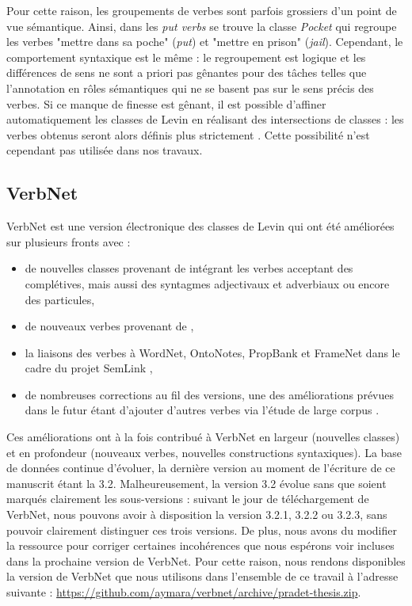 Pour cette raison, les groupements de verbes sont parfois grossiers d'un point
de vue sémantique. Ainsi, dans les \textit{put verbs} se trouve la classe
\textit{Pocket} qui regroupe les verbes "mettre dans sa poche" (\emph{put}) et
"mettre en prison" (\emph{jail}). Cependant, le comportement syntaxique est le
même : le regroupement est logique et les différences de sens ne sont a priori
pas gênantes pour des tâches telles que l'annotation en rôles sémantiques qui
ne se basent pas sur le sens précis des verbes. Si ce manque de finesse est
gênant, il est possible d'affiner automatiquement les classes de Levin en
réalisant des intersections de classes : les verbes obtenus seront alors
définis plus strictement \citep{dang1998investigating}. Cette possibilité n'est
cependant pas utilisée dans nos travaux.

\subsection{VerbNet}
\label{presentation_verbnet}

VerbNet \citep{kipperschuler2005verbnet} est une version électronique des
classes de Levin qui ont été améliorées sur plusieurs fronts avec :

\begin{itemize}

    \item de nouvelles classes provenant de \cite{korhonen2004extended}
        intégrant les verbes acceptant des complétives, mais aussi des
        syntagmes adjectivaux et adverbiaux ou encore des particules,

    \item de nouveaux verbes provenant de \cite{dorr2001lcs},

    \item la liaisons des verbes à WordNet, OntoNotes, PropBank et FrameNet
        dans le cadre du projet SemLink \citep{palmer2009semlink},

    \item de nombreuses corrections au fil des versions, une des améliorations
        prévues dans le futur étant d'ajouter d'autres verbes via l'étude de
        large corpus \citep{bonial2013expanding}.

\end{itemize}

Ces améliorations ont à la fois contribué à VerbNet en largeur (nouvelles
classes) et en profondeur (nouveaux verbes, nouvelles constructions
syntaxiques). La base de données continue d'évoluer, la dernière version au
moment de l'écriture de ce manuscrit étant la 3.2. Malheureusement, la version
3.2 évolue sans que soient marqués clairement les sous-versions : suivant le
jour de téléchargement de VerbNet, nous pouvons avoir à disposition la version
3.2.1, 3.2.2 ou 3.2.3, sans pouvoir clairement distinguer ces trois versions.
De plus, nous avons du modifier la ressource pour corriger certaines
incohérences que nous espérons voir incluses dans la prochaine version de
VerbNet. Pour cette raison, nous rendons disponibles la version de VerbNet que
nous utilisons dans l'ensemble de ce travail à l'adresse suivante :
\url{https://github.com/aymara/verbnet/archive/pradet-thesis.zip}.


